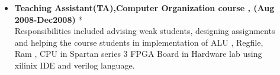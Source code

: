 \documentclass[]{res}
\newcommand{\resheading}[1]{{\large \parashade[.9]{sharpcorners}{\textbf{#1 \vphantom{p\^{E}}}}}}
\begin{document}
\begin{description}
\item[]
\begin{itemize}
	\item \textbf{ Teaching Assistant(TA),Computer Organization course , (Aug 2008-Dec2008)} *\\
	Responsibilities included advising weak students, designing assignments  and  helping the course students in implementation of ALU , Regfile, Ram , CPU in Spartan series 3 FPGA Board in Hardware lab using xilinix IDE and verilog language.
\end{itemize}

\end{description}


% 
\end{document}
